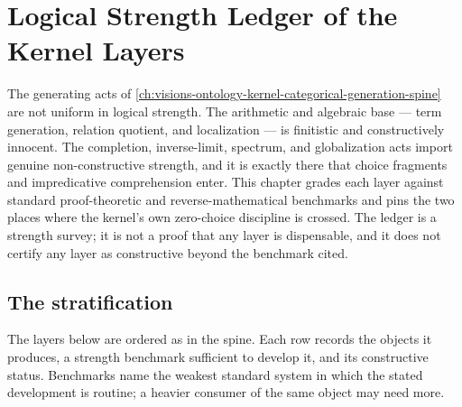 \chapter{Logical Strength Ledger of the Kernel Layers}
\label{ch:visions-ontology-kernel-logical-strength-ledger}

The generating acts of \autoref{ch:visions-ontology-kernel-categorical-generation-spine}
are not uniform in logical strength.  The arithmetic and algebraic base ---
term generation, relation quotient, and localization --- is finitistic and
constructively innocent.  The completion, inverse-limit, spectrum, and
globalization acts import genuine non-constructive strength, and it is exactly
there that choice fragments and impredicative comprehension enter.  This chapter
grades each layer against standard proof-theoretic and reverse-mathematical
benchmarks and pins the two places where the kernel's own zero-choice discipline
is crossed.  The ledger is a strength survey; it is not a proof that any layer
is dispensable, and it does not certify any layer as constructive beyond the
benchmark cited.

\section{The stratification}
\label{sec:ontology-kernel-strength-stratification}

The layers below are ordered as in the spine.  Each row records the objects it
produces, a strength benchmark sufficient to develop it, and its constructive
status.  Benchmarks name the weakest standard system in which the stated
development is routine; a heavier consumer of the same object may need more.

